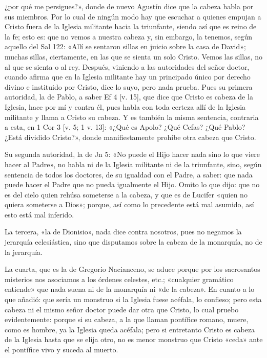 ¿por qué me persigues?», donde de nuevo Agustín dice que la cabeza habla por sus miembros. Por lo cual de ningún modo hay que escuchar a quienes empujan a Cristo fuera de la Iglesia militante hacia la triunfante, siendo así que es reino de la fe; esto es: que no vemos a nuestra cabeza y, sin embargo, la tenemos, según aquello del Sal 122: «Allí se sentaron sillas en juicio sobre la casa de David»; muchas sillas, ciertamente, en las que se sienta un solo Cristo. Vemos las sillas, no al que se sienta o al rey. Después, viniendo a las autoridades del señor doctor, cuando afirma que en la Iglesia militante hay un principado único por derecho divino e instituido por Cristo, dice lo suyo, pero nada prueba. Pues su primera autoridad, la de Pablo, a saber Ef 4 [v. 15], que dice que Cristo es cabeza de la Iglesia, hace por mí y contra él, pues habla con toda certeza allí de la Iglesia militante y llama a Cristo su cabeza. Y es también la misma sentencia, contraria a esta, en 1 Cor 3 [v. 5; 1 v. 13]: «¿Qué es Apolo? ¿Qué Cefas? ¿Qué Pablo? ¿Está dividido Cristo?», donde manifiestamente prohíbe otra cabeza que Cristo.

Su segunda autoridad, la de Jn 5: «No puede el Hijo hacer nada sino lo que viere hacer al Padre», no habla ni de la Iglesia militante ni de la triunfante, sino, según sentencia de todos los doctores, de su igualdad con el Padre, a saber: que nada puede hacer el Padre que no pueda igualmente el Hijo. Omito lo que dijo: que no es del cielo quien rehúsa someterse a la cabeza, y que es de Lucifer «quien no quiera someterse a Dios»; porque, así como lo precedente está mal asumido, así esto está mal inferido.

La tercera, «la de Dionisio», nada dice contra nosotros, pues no negamos la jerarquía eclesiástica, sino que disputamos sobre la cabeza de la monarquía, no de la jerarquía.

\marginpar{\small[258]} La cuarta, que es la de Gregorio Nacianceno, se aduce porque por los sacrosantos misterios nos asociamos a los órdenes celestes, etc.; «cualquier gramático entiende» que nada suena ni de la monarquía ni «de la cabeza». En cuanto a lo que añadió: que sería un monstruo si la Iglesia fuese acéfala, lo confieso; pero esta cabeza ni el mismo señor doctor puede dar otra que Cristo, lo cual pruebo evidentemente: porque si su cabeza, a la que llaman pontífice romano, muere, como es hombre, ya la Iglesia queda acéfala; pero si entretanto Cristo es cabeza de la Iglesia hasta que se elija otro, no es menor monstruo que Cristo «ceda» ante el pontífice vivo y suceda al muerto.

